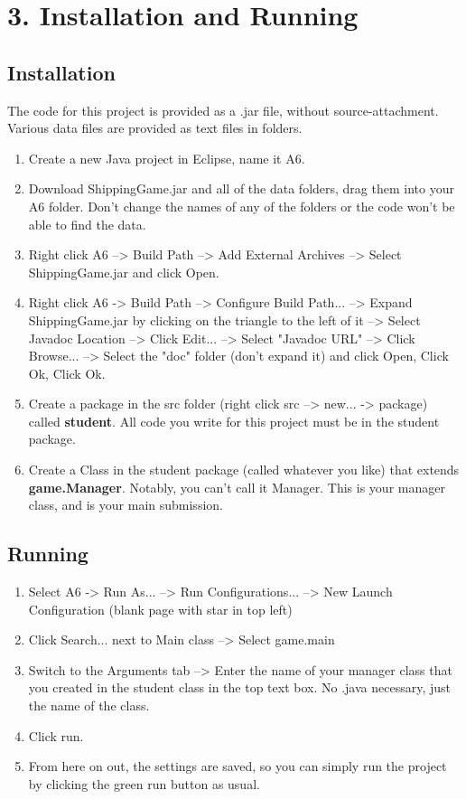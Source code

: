 \documentclass[11pt]{article}
\begin{document}
\newpage
\section{3. Installation and Running}
\subsection{Installation}
The code for this project is provided as a .jar file, without source-attachment.
Various data files are provided as text files in folders.
\begin{enumerate}
\item Create a new Java project in Eclipse, name it A6.
\item Download ShippingGame.jar and all of the data folders, drag them into your
	A6 folder. Don't change the names of any of the folders or the code won't be
	able to find the data.
\item Right click A6 --> Build Path --> Add External Archives --> Select
	ShippingGame.jar and click Open.
\item Right click A6 -> Build Path --> Configure Build Path... --> Expand
	ShippingGame.jar by clicking on the triangle to the left of it --> Select
	Javadoc Location --> Click Edit... --> Select "Javadoc URL" --> Click
	Browse... --> Select the "doc" folder (don't expand it) and click Open,
	Click Ok, Click Ok.
\item Create a package in the src folder (right click src --> new... -> package)
	called \textbf{student}. All code you write for this project must be in the
	student package.
\item Create a Class in the student package (called whatever you like) that
	extends \textbf{game.Manager}. Notably, you can't call it Manager. This is
	your manager class, and is your main submission.
\end{enumerate}

\subsection{Running}
\begin{enumerate}
\item Select A6 -> Run As... --> Run Configurations... --> New Launch
	Configuration (blank page with star in top left)
\item Click Search... next to Main class --> Select game.main
\item Switch to the Arguments tab --> Enter the name of your manager class that
	you created in the student class in the top text box. No .java necessary,
	just the name of the class.
\item Click run.
\item From here on out, the settings are saved, so you can simply run the
	project by clicking the green run button as usual.
\end{enumerate}
\end{document}
